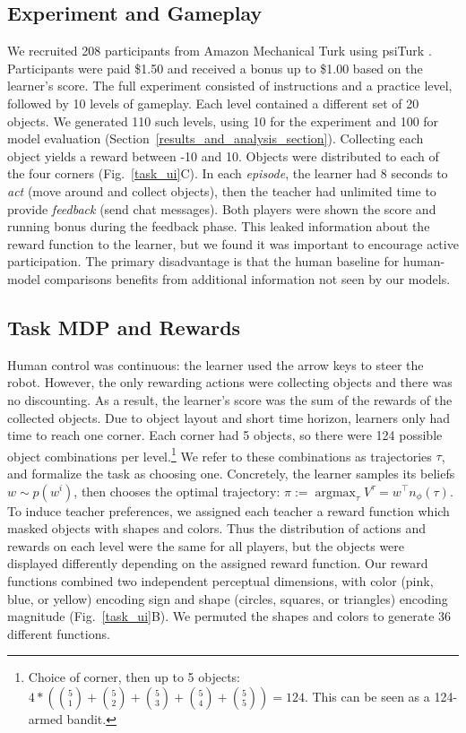 \documentclass[letterpaper]{article} %
\DeclareMathOperator*{\argmax}{argmax}
\begin{document}
\subsection{Experiment and Gameplay}
We recruited 208 participants from Amazon Mechanical Turk using psiTurk \cite{gureckis_2016}. Participants were paid \$1.50 and received a bonus up to \$1.00 based on the learner's score. The full experiment consisted of instructions and a practice level, followed by 10 levels of gameplay. Each level contained a different set of 20 objects. We generated 110 such levels, using 10 for the experiment and 100 for model evaluation (Section~\ref{results_and_analysis_section}). Collecting each object yields a reward between -10 and 10. Objects were distributed to each of the four corners (Fig.~\ref{task_ui}C). In each \emph{episode}, the learner had 8 seconds to \emph{act} (move around and collect objects), then the teacher had unlimited time to provide \emph{feedback} (send chat messages). Both players were shown the score and running bonus during the feedback phase. This leaked information about the reward function to the learner, but we found it was important to encourage active participation. The primary disadvantage is that the human baseline for human-model comparisons benefits from additional information not seen by our models.

\subsection{Task MDP and Rewards}
\label{task_mdp}
\label{reward_functions}
Human control was continuous: the learner used the arrow keys to steer the robot. However, the only rewarding actions were collecting objects and there was no discounting. As a result, the learner's score was the sum of the rewards of the collected objects. Due to object layout and short time horizon, learners only had time to reach one corner. Each corner had 5 objects, so there were 124 possible object combinations per level.\footnote{Choice of corner, then up to 5 objects: $4 * ({5 \choose 1} + {5 \choose 2} + {5 \choose 3} + {5 \choose 4} + {5 \choose 5}) = 124$. This can be seen as a 124-armed bandit.} We refer to these combinations as trajectories $\tau$, and formalize the task as choosing one. Concretely, the learner samples its beliefs $w \sim p(w^i)$, then chooses the optimal trajectory: $\pi := \argmax_\tau V^\tau = w^{\top} n_\phi(\tau)$. To induce teacher preferences, we assigned each teacher a reward function which masked objects with shapes and colors. Thus the distribution of actions and rewards on each level were the same for all players, but the objects were displayed differently depending on the assigned reward function. Our reward functions combined two independent perceptual dimensions, with color (pink, blue, or yellow) encoding sign and shape (circles, squares, or triangles) encoding magnitude (Fig.~\ref{task_ui}B). We permuted the shapes and colors to generate 36 different functions.
\end{document}
